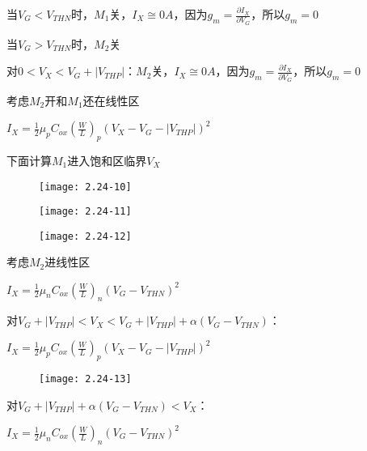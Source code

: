 当$V_G<V_{THN}$时，$M_1$关，$I_X\cong 0A$，因为$g_m=\frac{\partial I_X}{\partial V_G}$，所以$g_m=0$

\scalebox{2}{（2）}

当$V_G>V_{THN}$时，$M_2$关

对$0<V_X<V_G+|V_{THP}|$：$M_2$关，$I_X\cong 0A$，因为$g_m=\frac{\partial I_X}{\partial V_G}$，所以$g_m=0$

考虑$M_2$开和$M_1$还在线性区

$I_X=\frac{1}{2}\mu_pC_{ox}(\frac{W}{L})_p(V_{X}-V_G-|V_{THP}|)^2$

下面计算$M_1$进入饱和区临界$V_X$

\begin{figure}[H] %
	\begin{minipage}{\linewidth}
		\texttt{[image: 2.24-10]}
	\end{minipage}
\end{figure}

\begin{figure}[H] %
	\begin{minipage}{\linewidth}
		\texttt{[image: 2.24-11]}
	\end{minipage}
\end{figure}

\begin{figure}[H] %
	\begin{minipage}{\linewidth}
		\texttt{[image: 2.24-12]}
	\end{minipage}
\end{figure}

考虑$M_2$进线性区

$I_X=\frac{1}{2}\mu_nC_{ox}(\frac{W}{L})_n(V_G-V_{THN})^2$

对$V_G+|V_{THP}|<V_X<V_G+|V_{THP}|+\alpha(V_G-V_{THN})$：

$I_X=\frac{1}{2}\mu_pC_{ox}(\frac{W}{L})_p(V_{X}-V_G-|V_{THP}|)^2$

\begin{figure}[H] %
	\begin{minipage}{\linewidth}
		\texttt{[image: 2.24-13]}
	\end{minipage}
\end{figure}

对$V_G+|V_{THP}|+\alpha(V_G-V_{THN})<V_X$：

$I_X=\frac{1}{2}\mu_nC_{ox}(\frac{W}{L})_n(V_G-V_{THN})^2$

